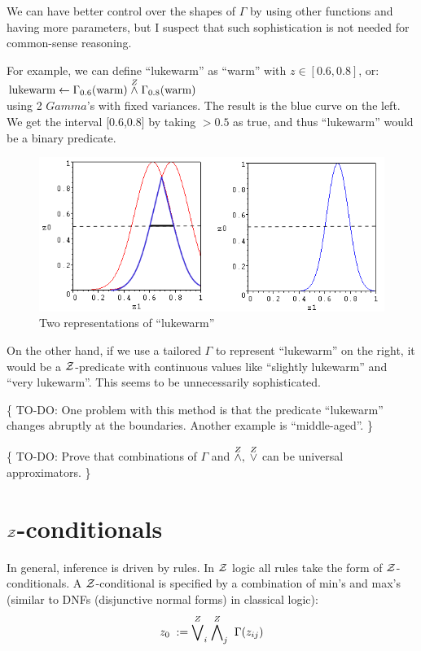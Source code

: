 We can have better control over the shapes of $\Gamma$ by using other functions and having more parameters, but I suspect that such sophistication is not needed for common-sense reasoning.

For example, we can define ``lukewarm'' as ``warm'' with $z \in [0.6,0.8]$, or:\\
\hspace*{1cm} $\mbox{lukewarm} \leftarrow \Gamma_{0.6}(\mbox{warm}) \stackrel{Z}{\wedge} \Gamma_{0.8}(\mbox{warm})$\\
using 2 $Gamma$'s with fixed variances.  The result is the blue curve on the left.  We get the interval [0.6,0.8] by taking $> 0.5$ as true, and thus ``lukewarm'' would be a binary predicate.
\begin{figure}[H]
\centering
\includegraphics[scale=0.9]{Gamma-for-lukewarm.png}
\caption{Two representations of ``lukewarm''}
\end{figure}
On the other hand, if we use a tailored $\Gamma$ to represent ``lukewarm'' on the right, it would be a $\mathcal{Z}$-predicate with continuous values like ``slightly lukewarm'' and ``very lukewarm''.  This seems to be unnecessarily sophisticated.

\{ TO-DO:  One problem with this method is that the predicate ``lukewarm'' changes abruptly at the boundaries.  Another example is ``middle-aged''.  \}

\{ TO-DO:  Prove that combinations of $\Gamma$ and $\stackrel{Z}{\wedge} ,\; \stackrel{Z}{\vee}$ can be universal approximators. \}

\section{$\mathcal{Z}$-conditionals}
\label{sec:Z-conditionals}

In general, inference is driven by rules.  In $\mathcal{Z}$ logic all rules take the form of $\mathcal{Z}$-conditionals.  A $\mathcal{Z}$-conditional is specified by a combination of min's and max's (similar to DNFs (disjunctive normal forms) in classical logic):
\begin{equation}
z_0 \; := \; \stackrel{Z}{\bigvee}_i \; \stackrel{Z}{\bigwedge}_j \; \Gamma(z_{ij})
\end{equation}

